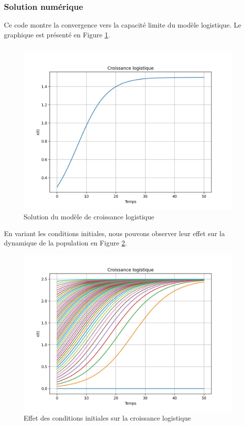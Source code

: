            \subsubsection{Solution numérique}
                Ce code montre la convergence vers la capacité limite du modèle logistique. Le graphique est présenté en Figure \ref{fig:logistique}.
                \inputminted{python}{codes/logistique.py}
                \begin{figure}[ht!]
                    \centering
                    \includegraphics[width=\textwidth]{images/logistique.jpg}
                    \caption{Solution du modèle de croissance logistique}
                    \label{fig:logistique}
                \end{figure}
                
                En variant les conditions initiales, nous pouvons observer leur effet sur la dynamique de la population en Figure \ref{fig:logistique2}.
                \begin{figure}[ht!]
                    \centering
                    \includegraphics[width=\textwidth]{images/logistique2.jpg}
                    \caption{Effet des conditions initiales sur la croissance logistique}
                    \label{fig:logistique2}
                \end{figure}
                
